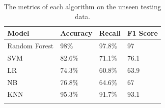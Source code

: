 \documentclass[12pt]{report}
\begin{document}
\begin{longtable}{ | p{} | p{} | p{} | p{} | }
    \hline
    \cellcolor{blue!25} Model & \cellcolor{blue!25} Accuracy & \cellcolor{blue!25} Recall & \cellcolor{blue!25} F1 Score\\
    \hline
    Random Forest & 98\% & 97.8\% & 97\\
    \hline
    SVM & 82.6\% & 71.1\% & 76.1\\
    \hline
    LR & 74.3\% & 60.8\% & 63.9\\
    \hline
    NB & 76.8\% & 64.6\% & 67\\
    \hline
    KNN & 95.3\% & 91.7\% & 93.1\\
    \hline
    \caption{The metrics of each algorithm on the unseen testing data.}\label{tab:Iteration1Testing}
\end{longtable}




\end{document}
